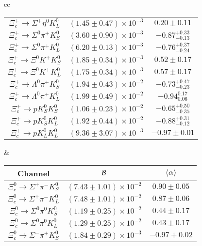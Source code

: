 \begin{table}
{\begin{tabular}{cc}
\begin{tabular}[t]{|c|c|c|}
				$ \Xi_{c}^{+} \to \Sigma^{+} \eta^{0} K_{L}^{0} $ &$(1.45\pm 0.47)\times 10^{-3}$ &$       0.20 \pm       0.11 $ \\
				$ \Xi_{c}^{+} \to \Sigma^{0} \pi^{+} K_{S}^{0} $ & $(3.60\pm 0.90)\times 10^{-3}$&$      -0.87 ^{+0.33}_{-0.13} $ \\
				$ \Xi_{c}^{+} \to \Sigma^{0} \pi^{+} K_{L}^{0} $ &$(6.20\pm 0.13)\times 10^{-3}$& $      -0.76^{+0.37}_{-0.24} $ \\
				$ \Xi_{c}^{+} \to \Xi^{0} K^{+} K_{S}^{0} $ &$(1.85\pm 0.34)\times 10^{-3}$& $       0.52 \pm       0.17 $ \\
				$ \Xi_{c}^{+} \to \Xi^{0} K^{+} K_{L}^{0} $ &$(1.75\pm 0.34)\times 10^{-3}$& $       0.57 \pm       0.17 $ \\
				$ \Xi_{c}^{+} \to \Lambda^{0} \pi^{+} K_{S}^{0} $&$(1.94\pm 0.43)\times 10^{-2}$ & $      -0.73^{+0.47}_{-0.23} $ \\
				$ \Xi_{c}^{+} \to \Lambda^{0} \pi^{+} K_{L}^{0} $&$(1.99\pm 0.49)\times 10^{-2}$ & $      -0.94 ^{ 0.17}_{0.06} $ \\
				\hline
				$ \Xi_{c}^{+} \to p K_{S}^{0} K_{S}^{0} $ &$(1.06\pm 0.23)\times 10^{-2}$ &$      -0.65 ^{+0.50}_{-0.35} $ \\
				$ \Xi_{c}^{+} \to p K_{S}^{0} K_{L}^{0} $ & $(1.92\pm 0.44)\times 10^{-2}$ &$      -0.88^{+ 0.31}_{-0.12} $ \\
				$ \Xi_{c}^{+} \to p K_{L}^{0} K_{L}^{0} $ &$(9.36\pm 3.07)\times 10^{-3}$ & $      -0.97 \pm       0.01 $ \\
				\hline
			\end{tabular}
			&
			\begin{tabular}[t]{|c|c|c|}
				\hline
				Channel  & ${\cal B}$ &$\langle \alpha \rangle$\\
				\hline
				$ \Xi_{c}^{0} \to \Sigma^{+} \pi^{-} K_{S}^{0} $ & $(7.43\pm 1.01)\times 10^{-2}$ &$       0.90 \pm       0.05 $ \\
				$ \Xi_{c}^{0} \to \Sigma^{+} \pi^{-} K_{L}^{0} $ &$(7.48\pm 1.01)\times 10^{-2}$  &$       0.87 \pm       0.06 $ \\
				$ \Xi_{c}^{0} \to \Sigma^{0} \pi^{0} K_{S}^{0} $ &$(1.19\pm 0.25)\times 10^{-2}$  &$       0.44 \pm       0.17 $ \\
				$ \Xi_{c}^{0} \to \Sigma^{0} \pi^{0} K_{L}^{0} $ &$(1.29\pm 0.25)\times 10^{-2}$  &$       0.43 \pm       0.17 $ \\
				$ \Xi_{c}^{0} \to \Sigma^{-} \pi^{+} K_{S}^{0} $ &$(1.84\pm 0.29)\times 10^{-3}$  &$      -0.97 \pm       0.02 $ \\

\end{tabular}
\end{tabular}}
\end{table}
